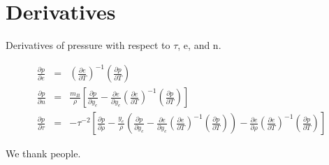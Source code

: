 \documentclass[twocolumn]{aastex62}
\begin{document}
\section{Derivatives}

Derivatives of pressure with respect to $\tau$, e, and n. \\
\begin{footnotesize}
\begin{eqnarray}
	\frac{\partial{p}}{\partial{e}} &=& \left(\frac{\partial{e}}{\partial{T}}\right)^{-1}\left(\frac{\partial{p}}{\partial{T}}\right) \\
	\frac{\partial{p}}{\partial{n}} &=& \frac{m_B}{\rho} \left[ \frac{\partial{p}}{\partial{y_e}} -
          \frac{\partial{e}}{\partial{y_e}}\left(\frac{\partial{e}}{\partial{T}}\right)^{-1}\left(\frac{\partial{p}}{\partial{T}}\right)\right]\\
	\frac{\partial{p}}{\partial{\tau}} &=& -\tau^{-2} \left[ \frac{\partial{p}}{\partial{\rho}} - \frac{y_e}{\rho} \left( \frac{\partial{p}}{\partial{y_e}} -
          \frac{\partial{e}}{\partial{y_e}} \left(\frac{\partial{e}}{\partial{T}}\right)^{-1}\left(\frac{\partial{p}}{\partial{T}}\right)\right) -
          \frac{\partial{e}}{\partial{\rho}}\left(\frac{\partial{e}}{\partial{T}}\right)^{-1}\left(\frac{\partial{p}}{\partial{T}}\right)\right]
\end{eqnarray}
\end{footnotesize}

\acknowledgements
We thank people.


\end{document}
